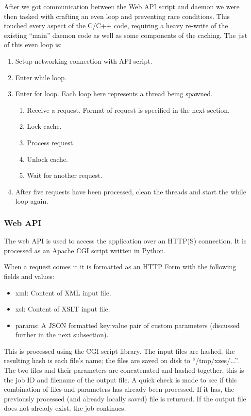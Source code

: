 After we got communication between the Web API script and daemon we were then tasked with crafting an even loop and preventing race conditions.
This touched every aspect of the C/C++ code, requiring a heavy re-write of the existing ``main'' daemon code as well as some components of the caching.
The jist of this even loop is:

\begin{enumerate}
  \item Setup networking connection with API script.
  \item Enter while loop.
  \item Enter for loop. Each loop here represents a thread being spawned.
  \begin{enumerate}
    \item Receive a request. Format of request is specified in the next section.
    \item Lock cache.
    \item Process request.
    \item Unlock cache.
    \item Wait for another request.
  \end{enumerate}
  \item After five requests have been processed, clean the threads and start the while loop again.
\end{enumerate}

\subsubsection{Web API}

The web API is used to access the application over an HTTP(S) connection.
It is processed as an Apache CGI script written in Python.

When a request comes it it is formatted as an HTTP Form with the following fields and values:

\begin{itemize}
  \item xml: Content of XML input file.
  \item xsl: Content of XSLT input file.
  \item params: A JSON formatted key:value pair of custom parameters (discussed further in the next subsection).
\end{itemize}

This is processed using the CGI script library.
The input files are hashed, the resulting hash is each file's name; the files are saved on disk to ``/tmp/xzes/...''.
The two files and their parameters are concatenated and hashed together, this is the job ID and filename of the output file.
A quick check is made to see if this combination of files and parameters has already been processed.
If it has, the previously processed (and already locally saved) file is returned.
If the output file does not already exist, the job continues.

